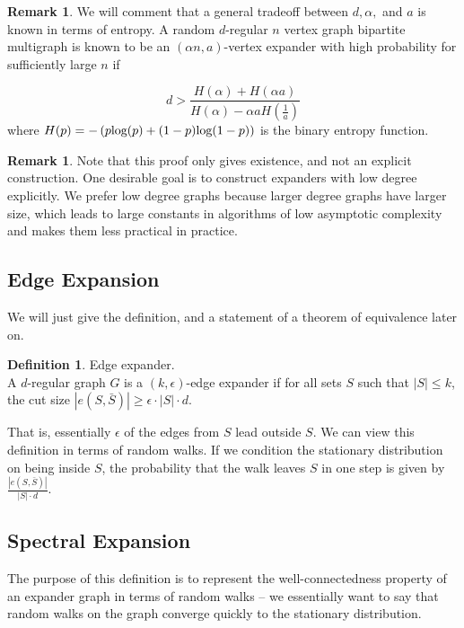 \documentclass[11pt]{article}
\theoremstyle{definition}
\newtheorem{definition}[theorem]{Definition}
\theoremstyle{definition}
\theoremstyle{definition}
\newtheorem{remark}[theorem]{Remark}
\newcommand{\txt}[1]
{\textnormal{#1}}
\begin{document}
\begin{remark}
We will comment that a general tradeoff between $d, \alpha, $ and $a$ is known in terms of entropy.
A random $d$-regular $n$ vertex graph bipartite multigraph is known to be an $(\alpha n, a)$-vertex expander with high probability for sufficiently large $n$ if 

\[
d > \frac{H(\alpha) + H(\alpha a)}{H(\alpha) - \alpha a H(\frac{1}{a})}
\]
where $H(p) = -\left(p\txt{log}(p) + (1 - p)\txt{log}(1 - p)\right)$ is the binary entropy function.
\end{remark}

\begin{remark}
Note that this proof only gives existence, and not an explicit construction. One desirable goal is to construct expanders with low degree explicitly. We prefer low degree graphs because larger degree graphs have larger size, which leads to large constants in algorithms of low asymptotic complexity and makes them less practical in practice.
\end{remark}

\subsection{Edge Expansion}

We will just give the definition, and a statement of a theorem of equivalence later on. 

\begin{definition} Edge expander. \\
A $d$-regular graph $G$ is a $(k, \epsilon)$-edge expander if for all sets $S$ such that $|S| \leq k$, the cut size $|e(S, \bar{S})| \geq \epsilon \cdot |S| \cdot d$.
\end{definition}

That is, essentially $\epsilon$ of the edges from $S$ lead outside $S$. We can view this definition in terms of random walks. If we condition the stationary distribution on being inside $S$, the probability that the walk leaves $S$ in one step is given by $\frac{|e(S, \bar{S})|}{|S|\cdot d}$.  

\subsection{Spectral Expansion}

The purpose of this definition is to represent the well-connectedness property of an expander graph
in terms of random walks -- we essentially want to say that random walks on the graph converge quickly to the stationary distribution. 
\end{document}

